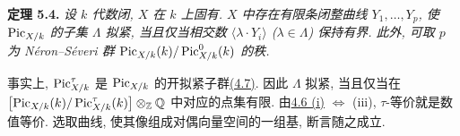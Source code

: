 \textbf{定理 5.4.} \emph{设 \(k\) 代数闭, \(X\) 在 \(k\) 上固有. \(X\) 中存在有限条闭整曲线 \(Y_1,\ldots,Y_p\), 使 \(\operatorname{Pic}_{X/k}\) 的子集 \(\Lambda\) 拟紧, 当且仅当相交数 \(\langle\lambda\cdot Y_i\rangle\) (\(\lambda\in\Lambda\)) 保持有界. 此外, 可取 \(p\) 为 N\'eron--S\'everi 群 \(\operatorname{Pic}_{X/k}(k)/\operatorname{Pic}^0_{X/k}(k)\) 的秩.}

事实上, \(\operatorname{Pic}^\tau_{X/k}\) 是 \(\operatorname{Pic}_{X/k}\) 的开拟紧子群\hyperlink{sga6.e13.thm.4-7}{(4.7)}. 因此 \(\Lambda\) 拟紧, 当且仅当在 \(\bigl[\operatorname{Pic}_{X/k}(k)/\operatorname{Pic}^\tau_{X/k}(k)\bigr]\otimes_{\mathbb Z}\mathbb Q\) 中对应的点集有限. 由\hyperlink{sga6.e13.thm.4-6}{4.6 (i)} \(\Longleftrightarrow\) (iii), \(\tau\)-等价就是数值等价. 选取曲线, 使其像组成对偶向量空间的一组基, 断言随之成立.


